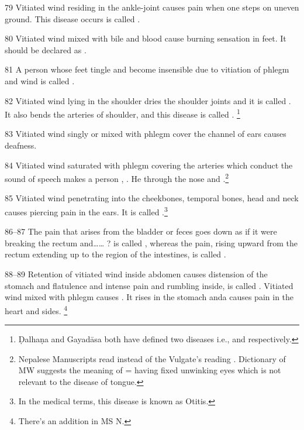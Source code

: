 \begin{translation}
{\item[79] Vitiated wind residing in the ankle-joint causes pain when one steps on uneven ground. This disease occurs is called .

\item[80] Vitiated wind mixed with bile and blood cause burning sensation in feet. 
It should be declared as .

\item[81] A person whose feet tingle and become insensible due to vitiation of phlegm and wind is called .

\item[82] Vitiated wind lying in the shoulder dries the shoulder joints and it is called . It also bends the arteries of shoulder, and this disease is called . \footnote{Ḍalhaṇa and Gayadāsa both have defined two diseases i.e.,  and  respectively.}

\item[83] Vitiated wind singly or mixed with phlegm cover the channel of ears causes deafness.

\item[84] Vitiated wind saturated with phlegm covering the arteries which 
conduct the sound of speech makes a person , 
. He  through the nose and 
.\footnote{Nepalese Manuscripts read  
instead of the Vulgate’s reading . Dictionary of MW suggests the 
meaning of  = having fixed unwinking eyes which is not relevant to 
the disease of tongue.}

\item[85] Vitiated wind penetrating into the cheekbones, temporal bones, head 
and neck causes piercing pain in the ears. It is called 
.\footnote{In the medical terms, this disease is known 
as Otitis.}

\item[86--87] The pain that arises from the bladder or feces goes down as if it were breaking the rectum and…… ? is called , whereas the pain, rising upward from the rectum extending up to the region of the intestines, is called .

\item[88--89] Retention of vitiated wind inside abdomen causes distension of the 
stomach and flatulence and intense pain and rumbling inside, is called 
. Vitiated wind mixed with phlegm causes 
. It rises in the stomach anda causes pain in the heart and 
sides. \footnote{There’s an addition in MS N. }

}
\end{translation}
